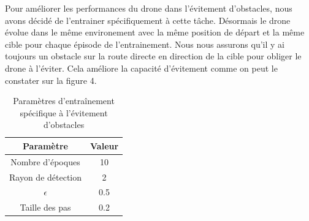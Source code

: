 \documentclass[a4paper, 12pt]{article}
\begin{document}
Pour améliorer les performances du drone dans l'évitement d'obstacles, nous avons décidé de l'entrainer spécifiquement à cette tâche. Désormais le drone évolue dans le même environement avec la même position de départ et la même cible pour chaque épisode de l'entrainement. Nous nous assurons qu'il y ai toujours un obstacle sur la route directe en direction de la cible pour obliger le drone à l'éviter. Cela améliore la capacité d'évitement comme on peut le constater sur la figure 4.
\begin{table}[H]
    \centering
    \begin{tabular}{|c|c|}
        \hline
        \textbf{Paramètre} & \textbf{Valeur} \\
        \hline
        Nombre d'époques & 10 \\
        Rayon de détection & 2 \\
        $\epsilon$ & 0.5 \\
        Taille des pas & 0.2 \\
        \hline
    \end{tabular}
    \caption{Paramètres d'entraînement spécifique à l'évitement d'obstacles}
    \label{tab:training-parameters}
\end{table}
\end{document}
